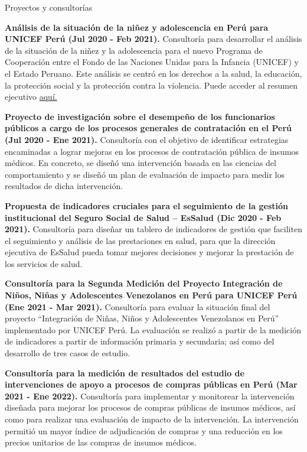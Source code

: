 \documentclass{resume} %
\begin{document}
\pagebreak
\begin{rSection}{Proyectos y consultorías}
\item \textbf{Análisis de la situación de la niñez y adolescencia en Perú para UNICEF Perú (Jul 2020 - Feb 2021).} {Consultoría para desarrollar el análisis de la situación de la niñez y la adolescencia para el nuevo Programa de Cooperación entre el Fondo de las Naciones Unidas para la Infancia (UNICEF) y el Estado Peruano. Este análisis se centró en los derechos a la salud, la educación, la protección social y la protección contra la violencia. Puede acceder al resumen ejecutivo \href{https://www.unicef.org/peru/media/12141/file/Resumen Ejecutivo: Situaci%C3%B3n de ni%C3%B1as, ni%C3%B1os y adolescentes en el Per%C3%BA .pdf}{aquí.}}
\item \textbf{Proyecto de investigación sobre el desempeño de los funcionarios públicos a cargo de los procesos generales de contratación en el Perú (Jul 2020 - Ene 2021).} {Consultoría con el objetivo de identificar estrategias encaminadas a lograr mejoras en los procesos de contratación pública de insumos médicos. En concreto, se diseñó una intervención basada en las ciencias del comportamiento y se diseñó un plan de evaluación de impacto para medir los resultados de dicha intervención.}
\item \textbf{Propuesta de indicadores cruciales para el seguimiento de la gestión institucional del Seguro Social de Salud – EsSalud (Dic 2020 - Feb 2021).} {Consultoría para diseñar un tablero de indicadores de gestión que faciliten el seguimiento y análisis de las prestaciones en salud, para que la dirección ejecutiva de EsSalud pueda tomar mejores decisiones y mejorar la prestación de los servicios de salud.}
\item \textbf{Consultoría para la Segunda Medición del Proyecto Integración de Niños, Niñas y Adolescentes Venezolanos en Perú para UNICEF Perú (Ene 2021 - Mar 2021).} {Consultoría para evaluar la situación final del proyecto “Integración de Niñas, Niños y Adolescentes Venezolanos en Perú” implementado por UNICEF Perú. La evaluación se realizó a partir de la medición de indicadores a partir de información primaria y secundaria; así como del desarrollo de tres casos de estudio.}
\item \textbf{Consultoría para la medición de resultados del estudio de intervenciones de apoyo a procesos de compras públicas en Perú (Mar 2021 - Ene 2022).} {Consultoría para implementar y monitorear la intervención diseñada para mejorar los procesos de compras públicas de insumos médicos, así como para realizar una evaluación de impacto de la intervención. La intervención permitió un mayor índice de adjudicación de compras y una reducción en los precios unitarios de las compras de insumos médicos.}

\end{rSection}
\end{document}
